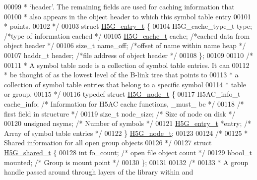 \begin{DoxyCode}
00099 \textcolor{comment}{ * `header'.  The remaining fields are used for caching information that}
00100 \textcolor{comment}{ * also appears in the object header to which this symbol table entry}
00101 \textcolor{comment}{ * points.}
00102 \textcolor{comment}{ */}
00103 \textcolor{keyword}{struct }\hyperlink{struct_h5_g__entry__t}{H5G\_entry\_t} \{
00104     H5G\_cache\_type\_t type;              \textcolor{comment}{/*type of information cached         */}
00105     \hyperlink{union_h5_g__cache__t}{H5G\_cache\_t} cache;                  \textcolor{comment}{/*cached data from object header     */}
00106     \textcolor{keywordtype}{size\_t}      name\_off;               \textcolor{comment}{/*offset of name within name heap    */}
00107     haddr\_t     header;                 \textcolor{comment}{/*file address of object header      */}
00108 \};
00109 
00110 \textcolor{comment}{/*}
00111 \textcolor{comment}{ * A symbol table node is a collection of symbol table entries.  It can}
00112 \textcolor{comment}{ * be thought of as the lowest level of the B-link tree that points to}
00113 \textcolor{comment}{ * a collection of symbol table entries that belong to a specific symbol}
00114 \textcolor{comment}{ * table or group.}
00115 \textcolor{comment}{ */}
00116 \textcolor{keyword}{typedef} \textcolor{keyword}{struct }\hyperlink{struct_h5_g__node__t}{H5G\_node\_t} \{
00117     H5AC\_info\_t cache\_info;     \textcolor{comment}{/* Information for H5AC cache functions, \_must\_ be */}
00118                                 \textcolor{comment}{/* first field in structure */}
00119     \textcolor{keywordtype}{size\_t} node\_size;           \textcolor{comment}{/* Size of node on disk              */}
00120     \textcolor{keywordtype}{unsigned} nsyms;             \textcolor{comment}{/* Number of symbols                 */}
00121     \hyperlink{struct_h5_g__entry__t}{H5G\_entry\_t} *entry;         \textcolor{comment}{/* Array of symbol table entries     */}
00122 \} \hyperlink{struct_h5_g__node__t}{H5G\_node\_t};
00123 
00124 \textcolor{comment}{/*}
00125 \textcolor{comment}{ * Shared information for all open group objects}
00126 \textcolor{comment}{ */}
00127 \textcolor{keyword}{struct }\hyperlink{struct_h5_g__shared__t}{H5G\_shared\_t} \{
00128     \textcolor{keywordtype}{int} fo\_count;                   \textcolor{comment}{/* open file object count */}
00129     hbool\_t mounted;                \textcolor{comment}{/* Group is mount point */}
00130 \};
00131 
00132 \textcolor{comment}{/*}
00133 \textcolor{comment}{ * A group handle passed around through layers of the library within and}

\end{DoxyCode}
